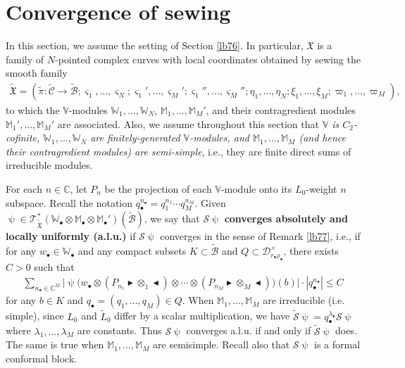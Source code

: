 \documentclass[12pt,a4paper,notitlepage]{report}
\theoremstyle{definition}
\theoremstyle{plain}
\newcommand{\fk}{\mathfrak}
\newcommand{\mc}{\mathcal}
\newcommand{\wtd}{\widetilde}
\newcommand{\scr}{\mathscr}
\newcommand{\sgm}{\varsigma}
\newcommand{\blt}{\bullet}
\newcommand{\Vbb}{\mathbb V}
\newcommand{\Wbb}{\mathbb W}
\newcommand{\Mbb}{\mathbb M}
\newcommand{\Cbb}{\mathbb C}
\newcommand{\btl}{\blacktriangleleft}
\newcommand{\btr}{\blacktriangleright}
\numberwithin{equation}{section}
\begin{document}
\section{Convergence of sewing}\label{lb147}


In this section, we assume the setting of Section \ref{lb76}. In particular, $\fk X$ is a family of $N$-pointed complex curves with local coordinates obtained by sewing the smooth family
\begin{align*}
\wtd{\fk X}=(\wtd\pi:\wtd{\mc C}\rightarrow\wtd{\mc B};\sgm_1,\dots,\sgm_N;\sgm_1',\dots,\sgm_M';\sgm_1'',\dots,\sgm_M'';\eta_1,\dots,\eta_N;\xi_1,\dots,\xi_M;\varpi_1,\dots,\varpi_M),
\end{align*}
to which the $\Vbb$-modules $\Wbb_1,\dots,\Wbb_N$, $\Mbb_1,\dots,\Mbb_M'$, and their contragredient modules $\Mbb_1',\dots,\Mbb_M'$ are associated.  Also, we assume throughout this section that \emph{$\Vbb$ is $C_2$-cofinite,  $\Wbb_1,\dots,\Wbb_N$ are finitely-generated $\Vbb$-modules, and $\Mbb_1,\dots,\Mbb_M$ (and hence their contragredient modules) are semi-simple}, i.e., they are finite direct sums of irreducible modules. 


For each $n\in\Cbb$, let $P_n$ be the projection of each $\Vbb$-module onto its $L_0$-weight $n$ subspace. Recall the notation $q_\blt^{n_\blt}=q_1^{n_1}\cdots q_M^{n_M}$. Given $\uppsi\in\scr T_{\wtd{\fk X}}^*(\Wbb_\blt\otimes\Mbb_\blt\otimes\Mbb_\blt')(\wtd{\mc B})$, we say that $\mc S\uppsi$ \textbf{converges absolutely and locally uniformly (a.l.u.)} if $\mc S\uppsi$ converges in the sense of Remark \ref{lb77}, i.e., if for any $w_\blt\in\Wbb_\blt$ and any compact subsets $K\subset\wtd{\mc B}$ and $Q\subset\mc D_{r_\blt\rho_\blt}^\times$, there exists $C>0$ such that
\begin{align*}
\sum_{n_\blt\in\Cbb^M}\Big|\uppsi\Big(w_\blt\otimes (P_{n_1}\btr\otimes_1\btl)\otimes\cdots\otimes (P_{n_M}\btr\otimes_M\btl)\Big)(b)   \Big|\cdot |q_\blt^{n_\blt}|\leq C
\end{align*}
for any $b\in K$ and $q_\blt=(q_1,\dots,q_M)\in Q$. When $\Mbb_1,\dots,\Mbb_M$ are irreducible (i.e. simple), since $L_0$ and $\wtd L_0$ differ by a scalar multiplication, we have $\wtd{\mc S}\uppsi=q_\blt^{\lambda_\blt}\mc S\uppsi$  where $\lambda_1,\dots,\lambda_M$ are constants. Thus $\mc S\uppsi$ converges a.l.u. if and only if $\wtd{\mc S}\uppsi$ does. The same is true when $\Mbb_1,\dots,\Mbb_M$ are semisimple. Recall also that $\mc S\uppsi$ is a formal conformal block.
\end{document}
